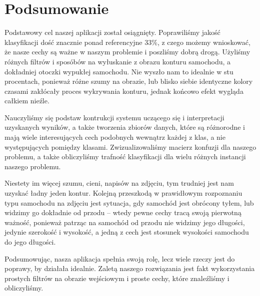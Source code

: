\documentclass{article}
\begin{document}
\section{Podsumowanie}
Podstawowy cel naszej aplikacji został osiągnięty. Poprawiliśmy jakość klasyfikacji dość znacznie ponad referencyjne $33\%$, z czego możemy wnioskować, że nasze cechy są ważne w naszym problemie i poszliśmy dobrą drogą. Użyliśmy różnych filtrów i sposóbów na wyłuskanie z obrazu konturu samochodu, a dokładniej otoczki wypukłej samochodu. Nie wyszło nam to idealnie w stu procentach, ponieważ różne szumy na obrazie, lub blisko siebie identyczne kolory czasami zakłócały proces wykrywania konturu, jednak końcowo efekt wygląda całkiem nieźle. 

Nauczyliśmy się podstaw kontrukcji systemu uczącego się i interpretacji uzyskanych wyników, a także tworzenia zbiorów danych, które są różnorodne i mają wiele interesujących cech podobnych wewnątrz każdej z klas, a nie występujących pomiędzy klasami. Zwizualizowaliśmy macierz konfuzji dla naszego problemu, a także obliczyliśmy trafność klasyfikacji dla wielu różnych instancji naszego problemu.

Niestety im więcej szumu, cieni, napisów na zdjęciu, tym trudniej jest nam uzyskać ładny jeden kontur. Kolejną przeszkodą w prawidłowym rozpoznaniu typu samochodu na zdjęciu jest sytuacja, gdy samochód jest obrócony tyłem, lub widzimy go dokładnie od przodu -- wtedy pewne cechy tracą swoją pierwotną ważność, ponieważ patrząc na samochód od przodu nie widzimy jego długości, jedynie szerokość i wysokość, a jedną z cech jest stosunek wysokości samochodu do jego długości.

Podsumowując, nasza aplikacja spełnia swoją rolę, lecz wiele rzeczy jest do poprawy, by działała idealnie. Zaletą naszego rozwiązania jest fakt wykorzystania prostych filtrów na obrazie wejściowym i proste cechy, które znaleźliśmy i obliczyliśmy.
\end{document}
